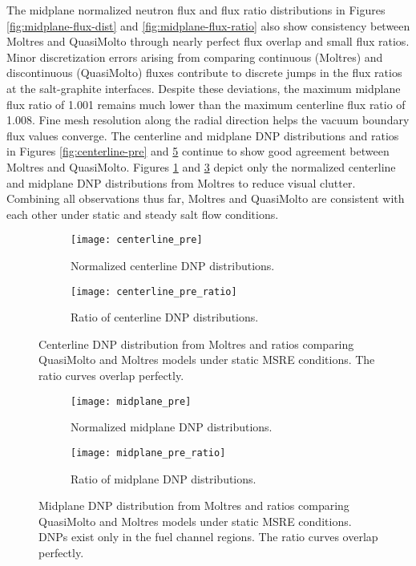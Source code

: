 The midplane normalized neutron flux and flux ratio distributions in Figures
\ref{fig:midplane-flux-dist} and \ref{fig:midplane-flux-ratio} also show consistency between
Moltres and QuasiMolto through nearly perfect flux overlap and small flux ratios. Minor
discretization errors arising from comparing continuous (Moltres) and discontinuous (QuasiMolto)
fluxes contribute to discrete jumps in the flux ratios at the salt-graphite interfaces. Despite
these deviations,
the maximum midplane flux ratio of 1.001 remains much lower than the maximum centerline flux ratio
of 1.008. Fine mesh resolution along the radial direction helps the vacuum boundary flux values
converge. The centerline and midplane \gls{DNP} distributions and ratios in Figures
\ref{fig:centerline-pre} and \ref{fig:midplane-pre} continue to show good agreement between Moltres
and QuasiMolto. Figures \ref{fig:centerline-pre-dist} and \ref{fig:midplane-pre-dist} depict only
the normalized centerline and midplane \gls{DNP} distributions from Moltres to reduce visual
clutter. Combining all observations thus far, Moltres and QuasiMolto are consistent with each other
under static and steady salt flow conditions.

\begin{figure}[t]
  \centering
  \begin{subfigure}[b]{0.48\columnwidth}
    \centering
    \texttt{[image: centerline\_pre]}
    \caption{Normalized centerline \gls{DNP} distributions.}
    \label{fig:centerline-pre-dist}
  \end{subfigure}
  \hfill
  \begin{subfigure}[b]{0.48\columnwidth}
    \centering
    \texttt{[image: centerline\_pre\_ratio]}
    \caption{Ratio of centerline \gls{DNP} distributions.}
    \label{fig:centerline-pre-ratio}
  \end{subfigure}
  \caption{Centerline \gls{DNP} distribution from Moltres and ratios comparing QuasiMolto and
  Moltres models under static \gls{MSRE} conditions. The ratio curves overlap perfectly.}
  \label{fig:centerline-pre}
  \begin{subfigure}[b]{0.48\columnwidth}
    \centering
    \texttt{[image: midplane\_pre]}
    \caption{Normalized midplane \gls{DNP} distributions.}
    \label{fig:midplane-pre-dist}
  \end{subfigure}
  \hfill
  \begin{subfigure}[b]{0.48\columnwidth}
    \centering
    \texttt{[image: midplane\_pre\_ratio]}
    \caption{Ratio of midplane \gls{DNP} distributions.}
    \label{fig:midplane-pre-ratio}
  \end{subfigure}
  \caption{Midplane \gls{DNP} distribution from Moltres and ratios comparing QuasiMolto and Moltres
  models under static \gls{MSRE} conditions. \glspl{DNP} exist only in the fuel channel regions.
  The ratio curves overlap perfectly.}
  \label{fig:midplane-pre}
\end{figure}

